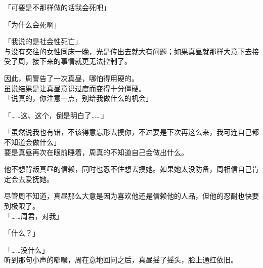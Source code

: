 「可要是不那样做的话我会死吧」

「为什么会死啊」

「我说的是社会性死亡」\\

与没有交往的女性同床一晚，光是传出去就大有问题；如果真昼就那样大意下去接受了周，接下来的事情就更无法控制了。

因此，周警告了一次真昼，哪怕得用硬的。\\

虽说结果是让真昼意识过度而变得十分僵硬。\\

「说真的，你注意一点，别给我做什么的机会」

「……这、这个，倒是明白了……」

「虽然说我也有错，不该得意忘形去摸你，不过要是下次再这么来，我可连自己都不知道会做什么」\\

要是真昼再次在眼前睡着，周真的不知道自己会做出什么。

他不想背叛真昼的信赖，同时也忍不住想去摸她。如果她太没防备，周相信自己肯定会去爱抚她。

尽管周不知道，真昼那么大意是因为喜欢他还是信赖他的人品，但他的忍耐也快要到极限了。\\

「……周君，对我」

「什么？」

「……没什么」\\

听到那句小声的嘟囔，周在意地回问之后，真昼摇了摇头，脸上通红依旧。
